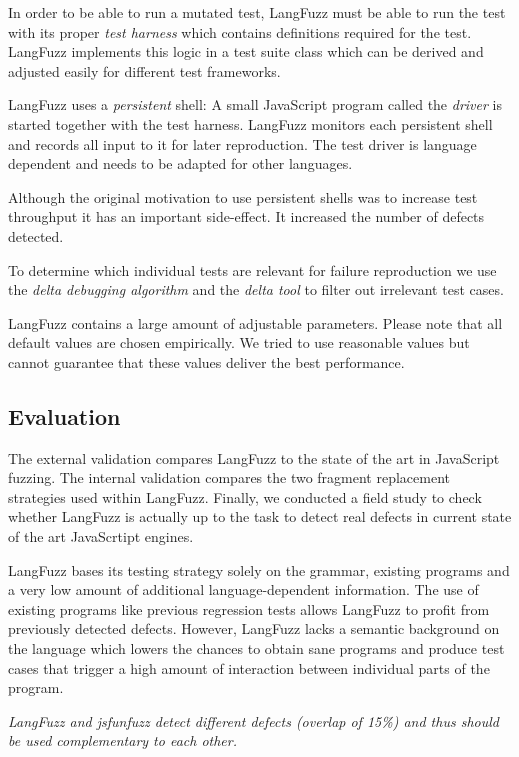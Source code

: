 In order to be able to run a mutated test, LangFuzz must be able to run the test with its proper \textit{test harness} which contains definitions required for the test.
LangFuzz implements this logic in a test suite class which can be derived and adjusted easily for different test frameworks.

LangFuzz uses a \textit{persistent} shell: A small JavaScript program called the \textit{driver} is started together with the test harness.
LangFuzz monitors each persistent shell and records all input to it for later reproduction.
The test driver is language dependent and needs to be adapted for other languages.

Although the original motivation to use persistent shells was to increase test throughput it has an important side-effect. It increased the number of defects detected.

To determine which individual tests are relevant for failure reproduction we use the \textit{delta debugging algorithm} and the \textit{delta tool} to filter out irrelevant test cases.

LangFuzz contains a large amount of adjustable parameters.
Please note that all default values are chosen empirically.
We tried to use reasonable values but cannot guarantee that these values deliver the best performance.

\subsection{Evaluation}
The external validation compares LangFuzz to the state of the art in JavaScript fuzzing.
The internal validation compares the two fragment replacement strategies used within LangFuzz. 
Finally, we conducted a field study to check whether LangFuzz is actually up to the task to 
detect real defects in current state of the art JavaScrtipt engines.

LangFuzz bases its testing strategy solely on the grammar, existing programs and a very low amount of additional language-dependent information.
The use of existing programs like previous regression tests allows LangFuzz to profit from previously detected defects.
However, LangFuzz lacks a semantic background on the language which lowers the chances to obtain sane programs and produce test cases that trigger a high amount of interaction between individual parts of the program.

\textit{LangFuzz and jsfunfuzz detect different defects (overlap of 15\%) and thus should be used complementary to each other.}

